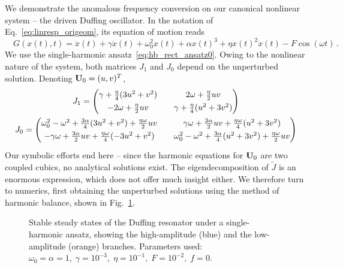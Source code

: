 We demonstrate the anomalous frequency conversion on our canonical nonlinear system -- the driven Duffing oscillator. In the notation of Eq.~\eqref{eq:linresp_origeom}, its equation of motion reads
\begin{equation} \label{eq:linresp_duffing}
\quad G(x(t), t) = \ddot{x}(t) + \gamma \dot{x}(t) + \omega_0^2 x(t) + \alpha x(t)^3 + \eta x(t)^2 \dot{x}(t) - F \cos(\omega t) \,.
\end{equation}
We use the single-harmonic ansatz~\eqref{eq:hb_rect_ansatz0}. Owing to the nonlinear nature of the system, both matrices $J_1$ and $J_0$ depend on the unperturbed solution. Denoting $\vb{U}_0 = (u,v)^T$,
%
\begin{equation}
\begin{gathered}
J_1 = \mqty(\gamma + \frac{\eta}{4} (3u^2 + v^2)  && 2 \omega + \frac{\eta}{2} u v\vspace*{1.2mm} \\  - 2 \omega + \frac{\eta}{2} u v && \gamma + \frac{\eta}{4} (u^2 + 3 v^2) ) \\ \vspace*{0.5mm}
J_0 = \mqty(\omega_0^2 - \omega^2 + \frac{3\alpha}{4} ( 3u^2 + v^2) + \frac{\eta \omega}{2} u v && 
\gamma \omega + \frac{3\alpha}{2} u v + \frac{\eta \omega}{4} (u^2 + 3v^2) \vspace*{1.2mm} \\
-\gamma \omega + \frac{3\alpha}{2} u v + \frac{\eta \omega}{4} (-3u^2 + v^2) && 
\omega_0^2 - \omega^2 + \frac{3\alpha}{4} ( u^2 + 3v^2) + \frac{\eta \omega}{2} u v
)
\end{gathered}
\end{equation}
%
Our symbolic efforts end here -- since the harmonic equations for $\vb{U}_0$ are two coupled cubics, no analytical solutions exist. The eigendecomposition of $\tilde{J}$ is an enormous expression, which does not offer much insight either. We therefore turn to numerics, first obtaining the unperturbed solutions using the method of harmonic balance, shown in Fig.~\ref{fig:linresp_Duffing_ref}.
\begin{figure} [h!]
	\centering
	\vspace*{-2mm}
	
	\caption{Stable steady states of the Duffing resonator under a single-harmonic ansatz, showing the high-amplitude (blue) and the low-amplitude (orange) branches. Parameters used: $\omega_0 = \alpha = 1, \; \gamma = 10^{-3} , \; \eta = 10^{-1},\; F = 10^{-2}, \;f=0$.}
	\label{fig:linresp_Duffing_ref} 
\end{figure}


